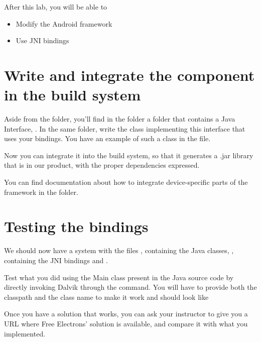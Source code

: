 
After this lab, you will be able to
\begin{itemize}
  \item Modify the Android framework
  \item Use JNI bindings
\end{itemize}

\section{Write and integrate the component in the build system}

Aside from the  folder, you'll find in the 
folder a  folder that contains a Java Interface,
. In the same folder, write the
 class implementing this interface that uses your
bindings. You have an example of such a class in the
 file.

Now you can integrate it into the build system, so that it generates a .jar
library that is in our product, with the proper dependencies expressed.

You can find documentation about how to integrate device-specific parts of the
framework in the  folder.

\section{Testing the bindings}

We should now have a system with the files
, containing the Java
classes, , containing the JNI bindings and
.

Test what you did using the Main class present in the Java source code
by directly invoking Dalvik through the 
command. You will have to provide both the classpath and the class
name to make it work and should look like

Once you have a solution that works, you can ask your instructor to
give you a URL where Free Electrons' solution is available, and compare
it with what you implemented.
